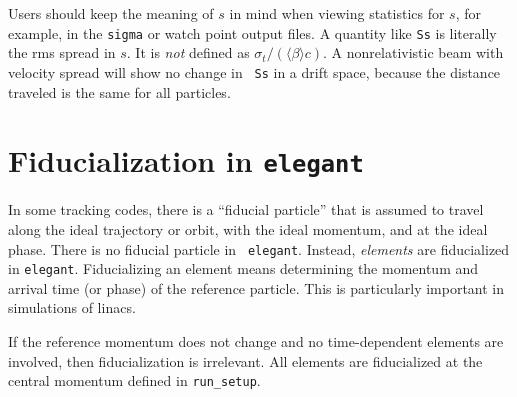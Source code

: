 \documentclass[11pt]{article}
\begin{document}
Users should keep the meaning of $s$ in mind when viewing statistics
for $s$, for example, in the {\tt sigma} or watch point output files.
A quantity like {\tt Ss} is literally the rms spread in $s$.  It is
{\em not} defined as $\sigma_t/(\langle \beta \rangle c)$.  A
nonrelativistic beam with velocity spread will show no change in {\tt
Ss} in a drift space, because the distance traveled is the same for
all particles.

\section{Fiducialization in {\tt elegant}}

In some tracking codes, there is a ``fiducial particle'' that is
assumed to travel along the ideal trajectory or orbit, with the ideal
momentum, and at the ideal phase.  There is no fiducial particle in {\tt
elegant}.  Instead, {\em elements} are fiducialized in {\tt elegant}.
Fiducializing an element means determining the momentum and arrival time
(or phase) of the reference particle.  This is particularly important
in simulations of linacs.

If the reference momentum does not change and no time-dependent elements
are involved, then fiducialization is irrelevant.  All elements are
fiducialized at the central momentum defined in \verb|run_setup|.
\end{document}
